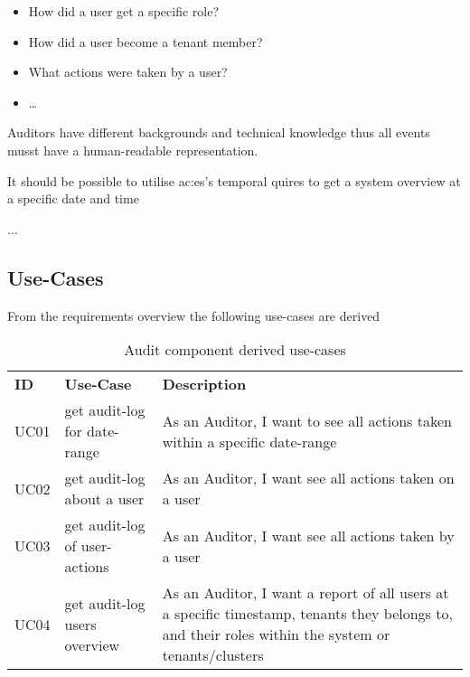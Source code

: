 \begin{itemize}
  \item How did a user get a specific role?
  \item How did a user become a tenant member?
  \item What actions were taken by a user?
  \item \dots
\end{itemize}

Auditors have different backgrounds and technical knowledge thus all events musst have a human-readable representation.

It should be possible to utilise \gls{ac:es}'s temporal quires  to get a system overview at a specific date and time 

...~\citep{SAIP}

\subsection{Use-Cases}

From the requirements overview the following use-cases are derived

\begin{table}[h!]
  \begin{center}
    \caption{Audit component derived use-cases}
    \label{tab:acuc}
    \def\arraystretch{1.5}
    \begin{tabularx}{\linewidth}{|l l X |}
      \hline
      \rowcolor{gray!20}
      \textbf{ID} & \textbf{Use-Case} & \textbf{Description}\\
      UC01 & get audit-log for date-range & As an Auditor, I want to see all actions taken within a specific date-range\\
      UC02 & get audit-log about a user & As an Auditor, I want see all actions taken on a user\\
      UC03 & get audit-log of user-actions & As an Auditor, I want see all actions taken by a user\\
      UC04 & get audit-log users overview & As an Auditor, I want a report of all users at a specific timestamp, tenants they belongs to, and their roles within the system or tenants/clusters\\
      \hline
    \end{tabularx}
  \end{center}
\end{table}


